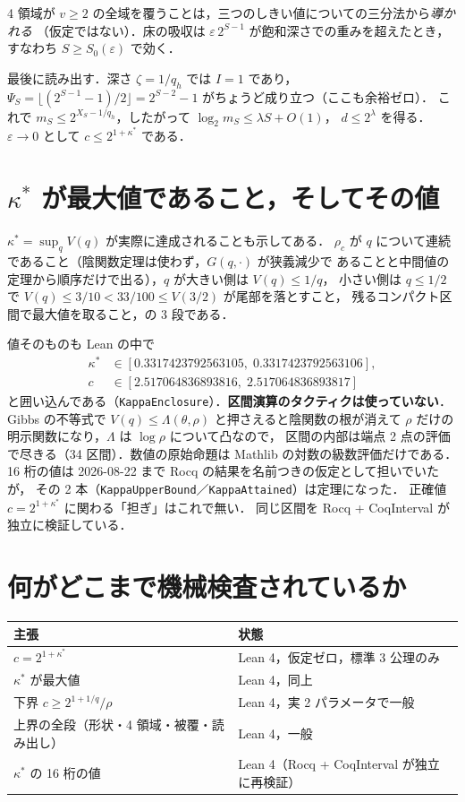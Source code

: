 \documentclass[a4paper,11pt]{jsarticle}
\begin{document}
4 領域が $v \ge 2$ の全域を覆うことは，三つのしきい値についての三分法から\emph{導かれる}
（仮定ではない）．床の吸収は $\varepsilon\, 2^{S-1}$ が飽和深さでの重みを超えたとき，
すなわち $S \ge S_0(\varepsilon)$ で効く．

最後に読み出す．深さ $\zeta = 1/q_h$ では $I = 1$ であり，
$\Psi_S = \lfloor(2^{S-1}{-}1)/2\rfloor = 2^{S-2}-1$ がちょうど成り立つ（ここも余裕ゼロ）．
これで $m_S \le 2^{X_S - 1/q_h}$，したがって $\log_2 m_S \le \lambda S + O(1)$，
$d \le 2^{\lambda}$ を得る．$\varepsilon \to 0$ として $c \le 2^{1+\kappa^*}$ である．

\section{$\kappa^*$ が最大値であること，そしてその値}
$\kappa^* = \sup_q V(q)$ が実際に達成されることも示してある．
$\rho_c$ が $q$ について連続であること（陰関数定理は使わず，$G(q,\cdot)$ が狭義減少で
あることと中間値の定理から順序だけで出る），$q$ が大きい側は $V(q) \le 1/q$，
小さい側は $q \le 1/2$ で $V(q) \le 3/10 < 33/100 \le V(3/2)$ が尾部を落とすこと，
残るコンパクト区間で最大値を取ること，の 3 段である．

値そのものも Lean の中で
\[
\begin{aligned}
\kappa^* &\in [0.3317423792563105,\; 0.3317423792563106], \\
c &\in [2.517064836893816,\; 2.517064836893817]
\end{aligned}
\]
と囲い込んである（\texttt{KappaEnclosure}）．\textbf{区間演算のタクティクは使っていない}．
Gibbs の不等式で $V(q) \le \Lambda(\theta,\rho)$ と押さえると陰関数の根が消えて
$\rho$ だけの明示関数になり，$\Lambda$ は $\log\rho$ について凸なので，
区間の内部は端点 2 点の評価で尽きる（34 区間）．数値の原始命題は
Mathlib の対数の級数評価だけである．
16 桁の値は 2026-08-22 まで Rocq の結果を名前つきの仮定として担いでいたが，
その 2 本（\texttt{KappaUpperBound}／\texttt{KappaAttained}）は定理になった．
正確値 $c = 2^{1+\kappa^*}$ に関わる「担ぎ」はこれで無い．
同じ区間を Rocq + CoqInterval が独立に検証している．

\section{何がどこまで機械検査されているか}
\begin{center}
\begin{tabular}{ll}
\hline
主張 & 状態 \\
\hline
$c = 2^{1+\kappa^*}$ & Lean 4，仮定ゼロ，標準 3 公理のみ \\
$\kappa^*$ が最大値 & Lean 4，同上 \\
下界 $c \ge 2^{1+1/q}/\rho$ & Lean 4，実 2 パラメータで一般 \\
上界の全段（形状・4 領域・被覆・読み出し） & Lean 4，一般 \\
$\kappa^*$ の 16 桁の値 & Lean 4（Rocq + CoqInterval が独立に再検証） \\
\hline
\end{tabular}
\end{center}
\end{document}
